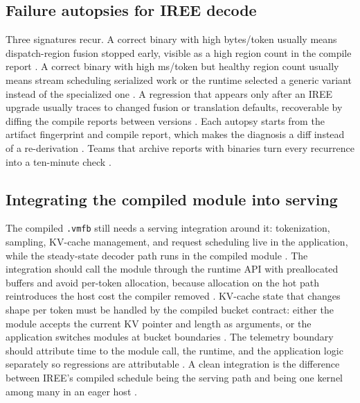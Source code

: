 \subsection{Failure autopsies for IREE decode}

Three signatures recur. A correct binary with high bytes/token usually means dispatch-region fusion stopped early, visible as a high region count in the compile report \citep{memoryfloor2026,iree2024}. A correct binary with high ms/token but healthy region count usually means stream scheduling serialized work or the runtime selected a generic variant instead of the specialized one \citep{taxbreak2026,patel2025llminference}. A regression that appears only after an IREE upgrade usually traces to changed fusion or translation defaults, recoverable by diffing the compile reports between versions \citep{chen2020compilerbasedhardw,memoryfloor2026}. Each autopsy starts from the artifact fingerprint and compile report, which makes the diagnosis a diff instead of a re-derivation \citep{patel2025llminference,iree2024}. Teams that archive reports with binaries turn every recurrence into a ten-minute check \citep{memoryfloor2026,taxbreak2026}.

\subsection{Integrating the compiled module into serving}

The compiled \texttt{.vmfb} still needs a serving integration around it: tokenization, sampling, KV-cache management, and request scheduling live in the application, while the steady-state decoder path runs in the compiled module \citep{kwon2023vllm,iree2024}. The integration should call the module through the runtime API with preallocated buffers and avoid per-token allocation, because allocation on the hot path reintroduces the host cost the compiler removed \citep{patel2025llminference,memoryfloor2026}. KV-cache state that changes shape per token must be handled by the compiled bucket contract: either the module accepts the current KV pointer and length as arguments, or the application switches modules at bucket boundaries \citep{chen2020compilerbasedhardw,iree2024}. The telemetry boundary should attribute time to the module call, the runtime, and the application logic separately so regressions are attributable \citep{patel2025llminference,taxbreak2026}. A clean integration is the difference between IREE's compiled schedule being the serving path and being one kernel among many in an eager host \citep{memoryfloor2026,patel2025llminference}.

